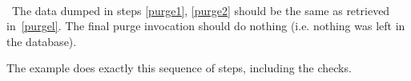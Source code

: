 \how\ 

\result\ The data dumped in steps \ref{purge1}, \ref{purge2} should be the
same as retrieved in~\ref{purgel}. The final purge invocation should
do nothing (i.e. nothing was left in the database).

\begin{hints}
The example  does exactly this sequence of steps,
including the checks.
\end{hints}
